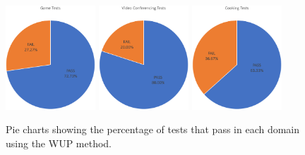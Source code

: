 \documentclass[11pt]{article}
\begin{document}
\begin{figure}
\begin{center}
  \includegraphics[width=0.3\textwidth]{game-test-pie.pdf}
  \includegraphics[width=0.3\textwidth]{calling-test-pie.pdf}
  \includegraphics[width=0.3\textwidth]{cooking-test-pie.pdf}
  \caption{Pie charts showing the percentage of tests that pass in each domain using the WUP method.}
  \label{fig:pie-charts-wup}
  \end{center}
\end{figure}
\end{document}
